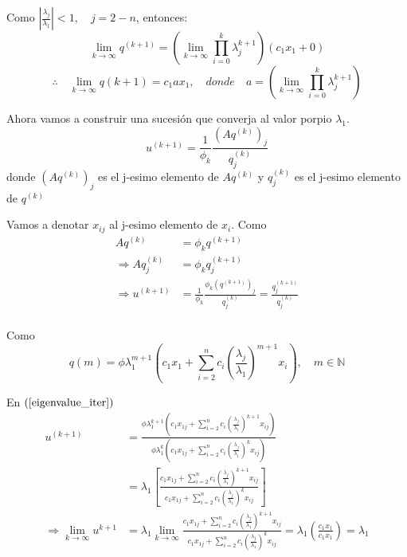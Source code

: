 \documentclass[10pt,a4paper]{article}
\newcommand{\ds}{\displaystyle}
\begin{document}
\begin{itemize}
Como $\left\vert\frac{\lambda_{j}}{\lambda_{1}}\right\vert < 1,\quad j=2-n$, entonces:
$$\lim_{k\rightarrow\infty}q^{(k+1)} = \left(\lim_{k\rightarrow\infty}\prod_{i=0}^{k}\lambda_{j}^{k+1}\right)(c_{1}x_{1}+0)$$
$$\therefore\quad\lim_{k\rightarrow\infty}q{(k+1)} = c_{1}ax_{1},\quad donde\quad a = \left(\lim_{k\rightarrow\infty}\prod_{i=0}^{k}\lambda_{j}^{k+1}\right)$$


Ahora vamos a construir una sucesión que converja al valor porpio $\lambda_{1}$.
\begin{equation}\label{eigenvalue_iter}
u^{(k+1)} = \frac{1}{\phi_{k}}\frac{(Aq^{(k)})_{j}}{q^{(k)}_{j}}
\end{equation}
donde $(Aq^{(k)})_{j}$ es el j-esimo elemento de $Aq^{(k)}$ y $q^{(k)}_{j}$ es el j-esimo elemento de $q^{(k)}$

Vamos a denotar $x_{ij}$ al j-esimo elemento de $x_{i}$. Como 
\begin{align*}
	Aq^{(k)} &= \phi_{k}q^{(k+1)}\\
	\Rightarrow	Aq^{(k)}_{j} &= \phi_{k}q^{(k+1)}_{j}\\
	\Rightarrow	u^{(k+1)} &= \frac{1}{\phi_{k}}\frac{\phi_{k}(q^{(k+1)})_{j}}{q^{(k)}_{j}} = \frac{q_{j}^{(k+1)}}{q_{j}^{(k)}}\\
\end{align*}

Como 
$$ q{(m)} = \phi\lambda_{1}^{m+1}\left(c_{1}x_{1} + \sum_{i=2}^{n}c_{i}\left(\frac{\lambda_{j}}{\lambda_{1}}\right)^{m+1}x_{i}\right),\quad m\in\mathbb{N}$$

En $(\ref{eigenvalue_iter})$
\begin{align*}
	u^{(k+1)} &= \frac{\phi\lambda_{1}^{k+1}\left(c_{1}x_{1j} + \ds\sum_{i=2}^{n}c_{i}\left(\frac{\lambda_{j}}{\lambda_{1}}\right)^{k+1}x_{ij}\right)}{\phi\lambda_{1}^{k}\left(c_{1}x_{1j} + \ds\sum_{i=2}^{n}c_{i}\left(\frac{\lambda_{j}}{\lambda_{1}}\right)^{k}x_{ij}\right)}\\
		&= \lambda_{1}\left[\frac{c_{1}x_{1j} + \ds\sum_{i=2}^{n}c_{i}\left(\frac{\lambda_{j}}{\lambda_{1}}\right)^{k+1}x_{ij}}{c_{1}x_{1j} + \ds\sum_{i=2}^{n}c_{i}\left(\frac{\lambda_{j}}{\lambda_{1}}\right)^{k}x_{ij}}\right]\\
	\Rightarrow	\lim_{k\rightarrow\infty}u^{k+1} &= \lambda_{1}\lim_{k\rightarrow\infty}	\frac{c_{1}x_{1j} + \ds\sum_{i=2}^{n}c_{i}\left(\frac{\lambda_{j}}{\lambda_{1}}\right)^{k+1}x_{ij}}{c_{1}x_{1j} + \ds\sum_{i=2}^{n}c_{i}\left(\frac{\lambda_{j}}{\lambda_{1}}\right)^{k}x_{ij}} = \lambda_{1}\left(\frac{c_{1}x_{1}}{c_{1}x_{1}}\right) = \lambda_{1}
\end{align*}


\end{itemize}
\end{document}
